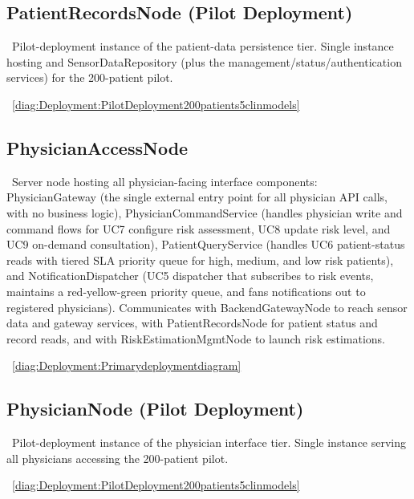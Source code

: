 \subsection{PatientRecordsNode (Pilot Deployment)}\label{node:DeploymentPatientRecordsNodePilotDeployment}
	\begin{description}
		\item[Responsibility:]~Pilot-deployment instance of the patient-data persistence tier. Single instance hosting  and SensorDataRepository (plus the management/status/authentication services) for the 200-patient pilot.
		\item[Visible on diagrams:]~\cref{diag:Deployment:PilotDeployment200patients5clinmodels}		
	\end{description}

\subsection{PhysicianAccessNode}\label{node:DeploymentPhysicianAccessNode}
	\begin{description}
		\item[Responsibility:]~Server node hosting all physician-facing interface components: PhysicianGateway (the single external entry point for all physician API calls, with no business logic), PhysicianCommandService (handles physician write and command flows for UC7 configure risk assessment, UC8 update risk level, and UC9 on-demand consultation), PatientQueryService (handles UC6 patient-status reads with tiered SLA priority queue for high, medium, and low risk patients), and NotificationDispatcher (UC5 dispatcher that subscribes to risk events, maintains a red-yellow-green priority queue, and fans notifications out to registered physicians). Communicates with BackendGatewayNode to reach sensor data and gateway services, with PatientRecordsNode for patient status and record reads, and with RiskEstimationMgmtNode to launch risk estimations.
		\item[Visible on diagrams:]~\cref{diag:Deployment:Primarydeploymentdiagram}		
	\end{description}

\subsection{PhysicianNode (Pilot Deployment)}\label{node:DeploymentPhysicianNodePilotDeployment}
	\begin{description}
		\item[Responsibility:]~Pilot-deployment instance of the physician interface tier. Single instance serving all physicians accessing the 200-patient pilot.
		\item[Visible on diagrams:]~\cref{diag:Deployment:PilotDeployment200patients5clinmodels}		
	\end{description}

